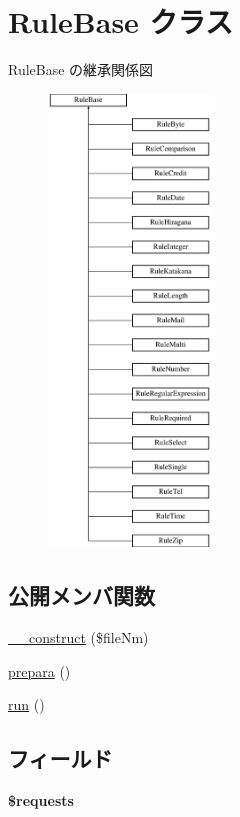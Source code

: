 \hypertarget{class_rule_base}{\section{Rule\+Base クラス}
\label{class_rule_base}
}
Rule\+Base の継承関係図\begin{figure}[H]
\begin{center}
\leavevmode
\includegraphics[height=12.000000cm]{class_rule_base}
\end{center}
\end{figure}
\subsection*{公開メンバ関数}
\begin{DoxyCompactItemize}
\item 
\hyperlink{class_rule_base_a7fdd69956610727a5a36b4f020bcf115}{\+\_\+\+\_\+construct} (\$file\+Nm)
\item 
\hyperlink{class_rule_base_a70eef3a06fda47704282eda5ea2706d9}{prepara} ()
\item 
\hyperlink{class_rule_base_afb0fafe7e02a3ae1993c01c19fad2bae}{run} ()
\end{DoxyCompactItemize}
\subsection*{フィールド}
\begin{DoxyCompactItemize}
\item 
\hypertarget{class_rule_base_a28d7688bd020a3b104adc19d1e08df96}{{\bfseries \$requests}}\label{class_rule_base_a28d7688bd020a3b104adc19d1e08df96}

\end{DoxyCompactItemize}
